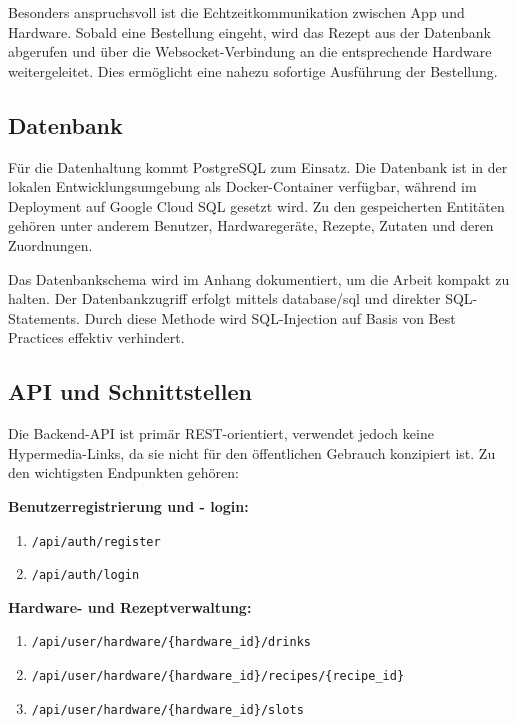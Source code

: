 Besonders anspruchsvoll ist die Echtzeitkommunikation zwischen App und Hardware. Sobald eine 
Bestellung eingeht, wird das Rezept aus der Datenbank abgerufen und über die Websocket-Verbindung 
an die entsprechende Hardware weitergeleitet. Dies ermöglicht eine nahezu sofortige Ausführung der 
Bestellung.

\subsection{Datenbank}

Für die Datenhaltung kommt PostgreSQL zum Einsatz. Die Datenbank ist in der lokalen 
Entwicklungsumgebung als Docker-Container verfügbar, während im Deployment auf Google Cloud SQL 
gesetzt wird. Zu den gespeicherten Entitäten gehören unter anderem Benutzer, Hardwaregeräte, 
Rezepte, Zutaten und deren Zuordnungen.

Das Datenbankschema wird im Anhang dokumentiert, um die Arbeit kompakt zu halten. Der 
Datenbankzugriff erfolgt mittels database/sql und direkter SQL-Statements. Durch diese Methode 
wird SQL-Injection auf Basis von Best Practices effektiv verhindert.

\subsection{API und 
Schnittstellen}

Die Backend-API ist primär REST-orientiert, verwendet jedoch keine Hypermedia-Links, da sie nicht 
für den öffentlichen Gebrauch konzipiert ist. Zu den wichtigsten Endpunkten gehören:

\vspace{0.5cm}
\textbf{Benutzerregistrierung und - login:}
\begin{enumerate}
  \item \texttt{/api/auth/register}
  \item \texttt{/api/auth/login}
\end{enumerate}

\vspace{0.5cm}
\textbf{Hardware- und Rezeptverwaltung:}
\begin{enumerate}
	\item \texttt{/api/user/hardware/\{hardware\_id\}/drinks}
	\item \texttt{/api/user/hardware/\{hardware\_id\}/recipes/\{recipe\_id\}}
	\item \texttt{/api/user/hardware/\{hardware\_id\}/slots}
\end{enumerate}

